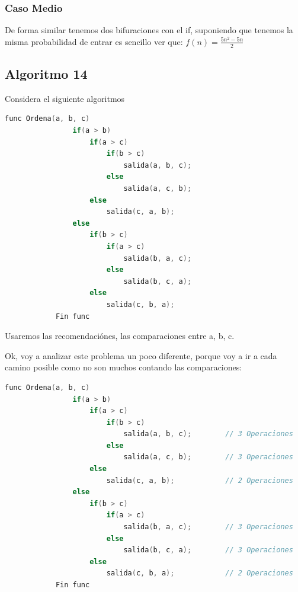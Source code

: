\documentclass[12pt, fleqn]{article}                            %
\theoremstyle{break}                                            %
\begin{document}
        \subsubsection{Caso Medio}

            De forma similar tenemos dos bifuraciones con el if, suponiendo que tenemos la misma
            probabilidad de entrar es sencillo ver que:
            $f(n) = \frac{5n^2 - 5n}{2}$




    \clearpage
    \subsection{Algoritmo 14}

        Considera el siguiente algoritmos
        \begin{lstlisting}[language=C, gobble=12, basicstyle=\small\color{white}]
            func Ordena(a, b, c)
                if(a > b)
                    if(a > c)
                        if(b > c)
                            salida(a, b, c);        
                        else
                            salida(a, c, b);       
                    else
                        salida(c, a, b);           
                else
                    if(b > c)
                        if(a > c)
                            salida(b, a, c);        
                        else
                            salida(b, c, a);        
                    else
                        salida(c, b, a);           
            Fin func
        \end{lstlisting}

        Usaremos las recomendaciónes, las comparaciones entre a, b, c.

        Ok, voy a analizar este problema un poco diferente, porque voy a ir a cada camino posible
        como no son muchos contando las comparaciones:
        \begin{lstlisting}[language=C, gobble=12, basicstyle=\small\color{white}]
            func Ordena(a, b, c)
                if(a > b)
                    if(a > c)
                        if(b > c)
                            salida(a, b, c);        // 3 Operaciones  
                        else
                            salida(a, c, b);        // 3 Operaciones        
                    else
                        salida(c, a, b);            // 2 Operaciones  
                else
                    if(b > c)
                        if(a > c)
                            salida(b, a, c);        // 3 Operaciones
                        else
                            salida(b, c, a);        // 3 Operaciones
                    else
                        salida(c, b, a);            // 2 Operaciones
            Fin func
        \end{lstlisting}
\end{document}
